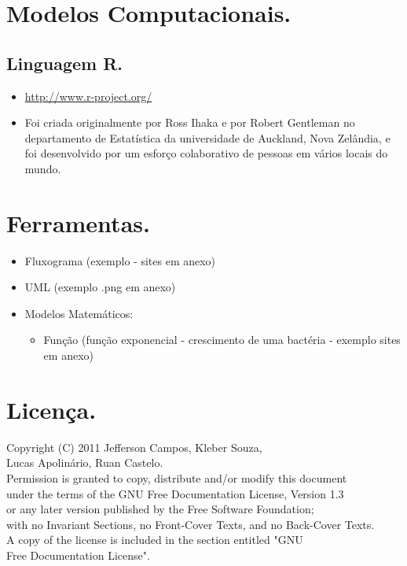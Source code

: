 \documentclass[a4paper,12pt]{article}
\begin{document}
\section{Modelos Computacionais.}

\subsection{Linguagem R.}
\begin{itemize}
\item \url{http://www.r-project.org/}
\item Foi criada originalmente por Ross Ihaka e por Robert Gentleman no departamento de Estatística da universidade de Auckland, Nova Zelândia, e foi desenvolvido por um esforço colaborativo de pessoas em vários locais do mundo.
\end{itemize}

\section{Ferramentas.}
\begin{itemize}
\item Fluxograma (exemplo - sites em anexo)
\item UML (exemplo .png em anexo)
\item Modelos Matemáticos:
\begin{itemize}
\item Função (função exponencial - crescimento de uma bactéria - exemplo sites em anexo) 
\end{itemize}
\end{itemize}

\section{Licença.}

Copyright (C)  2011 Jefferson Campos, Kleber Souza,\\
Lucas Apolinário, Ruan Castelo.\\
Permission is granted to copy, distribute and/or modify this document\\
under the terms of the GNU Free Documentation License, Version 1.3\\
or any later version published by the Free Software Foundation;\\
with no Invariant Sections, no Front-Cover Texts, and no Back-Cover Texts.\\
A copy of the license is included in the section entitled "GNU\\
Free Documentation License".

\nocite{MUNARI:2006}
\nocite{website:simulacao}
\nocite{website:cibernetica}
\nocite{website:cibernetica_GEROVITCH}
\nocite{website:cibernetica_MEDINA}
\nocite{website:cibernetica_WIENER}
\nocite{website:teoria_sistemas}
\nocite{texbook:teoria_sistema_KLIR}
\nocite{texbook:teoria_sistema_CHIAVENATO}
\nocite{texbook:teoria_sistema_BERTALANFFY}
\nocite{texbook:teoria_sistema_CAPRA}
\nocite{website:r_project}


\end{document}
